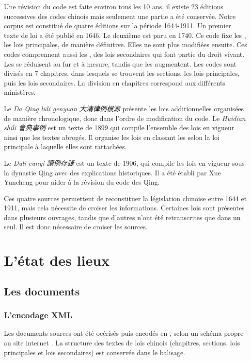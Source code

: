 Une révision du code est faite environ tous les 10 ans, il existe 23 éditions successives des codes chinois mais seulement une partie a été conservée. Notre corpus est constitué de quatre éditions sur la période 1644-1911.
Un premier texte de loi a été publié en 1646. Le deuxième est paru en 1740. Ce code fixe les \lu, les lois principales, de manière définitive. Elles ne sont plus modifiées ensuite. Ces codes comprennent aussi les \li, des lois secondaires qui font partie du droit vivant. Les \lu se réduisent au fur et à mesure, tandis que les \li augmentent. Les codes sont divisés en 7 chapitres, dans lesquels se trouvent les sections, les lois principales, puis les lois secondaires. La division en chapitres correspond aux différents ministères.

Le \textit{Da Qing lüli genyuan 大清律例根源} présente les lois additionnelles organisées de manière chronologique, donc dans l’ordre de modification du code. 
Le \textit{Huidian shili 會典事例} est un texte de 1899 qui compile l’ensemble des lois en vigueur ainsi que les textes abrogés. Il organise les lois en classant les \li selon la loi principale à laquelle elles sont rattachées.

Le \textit{Duli cunyi 讀例存疑} est un texte de 1906, qui compile les lois en vigueur sous la dynastie Qing avec des explications historiques. Il a été établi par Xue Yuncheng pour aider à la révision du code des Qing.

Ces quatre sources permettent de reconstituer la législation chinoise entre 1644 et 1911, mais cela nécessite de croiser les informations. Certaines lois sont présentes dans plusieurs ouvrages, tandis que d’autres n’ont été retranscrites que dans un seul. Il est donc nécessaire de croiser les sources. 

\newpage
\section*{L'état des lieux}
\subsection*{Les documents \XML}
\subsubsection{L’encodage XML}

Les documents sources ont été océrisés puis encodés en \XML, selon un schéma propre au site internet \LSC. La structure des textes de lois chinois (chapitres, sections, lois principales et lois secondaires) est conservée dans le balisage. 

